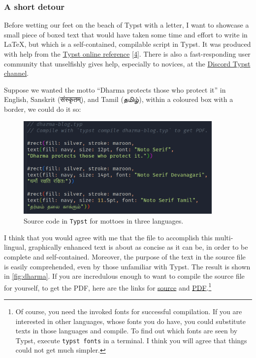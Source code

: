 \documentclass[
  a4paper,
]{article}
\begin{document}
\hypertarget{a-short-detour}{%
\subsubsection{A short detour}\label{a-short-detour}}

Before wetting our feet on the beach of Typst with a letter, I want to
showcase a small piece of boxed text that would have taken some time and
effort to write in LaTeX, but which is a self-contained, compilable
script in Typst. It was produced with help from the
\href{https://typst.app/docs/reference/}{Typst online reference}
{[}\protect\hyperlink{ref-typstref}{4}{]}. There is also a
fast-responding user community that unselfishly gives help, especially
to novices, at the
\href{https://discord.com/channels/1054443721975922748/1088372909111783525}{Discord
Typst channel}.

Suppose we wanted the motto ``Dharma protects those who protect it'' in
English, Sanskrit (संस्कृतम्), and Tamil (தமிழ்), within a coloured box with
a border, we could do it so:

\begin{figure}
\hypertarget{fig:dharma-source}{%
\centering
\includegraphics[width=0.9\textwidth,height=\textheight]{images/dharma-source.png}
\caption{Source code in \texttt{Typst} for mottoes in three
languages.}\label{fig:dharma-source}
}
\end{figure}

I think that you would agree with me that the file to accomplish this
multi-lingual, graphically enhanced text is about as concise as it can
be, in order to be complete and self-contained. Moreover, the purpose of
the text in the source file is easily comprehended, even by those
unfamiliar with Typst. The result is shown in \cref{fig:dharma}. If you
are incredulous enough to want to compile the source file for yourself,
to get the PDF, here are the links for
\href{auxiliary/dharma-blog.typ}{source} and
\href{auxiliary/dharma-blog.pdf}{PDF}.\footnote{Of course, you need the
  invoked fonts for successful compilation. If you are interested in
  other languages, whose fonts you do have, you could substitute texts
  in those languages and compile. To find out which fonts are seen by
  Typst, execute \texttt{typst\ fonts} in a terminal. I think you will
  agree that things could not get much simpler.}
\end{document}
